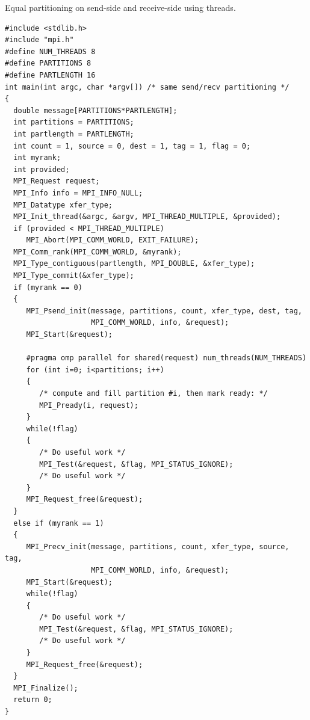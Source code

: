 \begin{example}
Equal partitioning on send-side and receive-side using threads.
\label{part-example2}%
%
%
\begin{lstlisting}[language={[MPI]C}]
#include <stdlib.h>
#include "mpi.h"
#define NUM_THREADS 8
#define PARTITIONS 8
#define PARTLENGTH 16
int main(int argc, char *argv[]) /* same send/recv partitioning */
{
  double message[PARTITIONS*PARTLENGTH];
  int partitions = PARTITIONS;
  int partlength = PARTLENGTH;
  int count = 1, source = 0, dest = 1, tag = 1, flag = 0;
  int myrank;
  int provided;
  MPI_Request request;
  MPI_Info info = MPI_INFO_NULL;
  MPI_Datatype xfer_type;
  MPI_Init_thread(&argc, &argv, MPI_THREAD_MULTIPLE, &provided);
  if (provided < MPI_THREAD_MULTIPLE)
     MPI_Abort(MPI_COMM_WORLD, EXIT_FAILURE);
  MPI_Comm_rank(MPI_COMM_WORLD, &myrank);
  MPI_Type_contiguous(partlength, MPI_DOUBLE, &xfer_type);
  MPI_Type_commit(&xfer_type);
  if (myrank == 0)
  {
     MPI_Psend_init(message, partitions, count, xfer_type, dest, tag,
                    MPI_COMM_WORLD, info, &request);
     MPI_Start(&request);

     #pragma omp parallel for shared(request) num_threads(NUM_THREADS)
     for (int i=0; i<partitions; i++)
     {
        /* compute and fill partition #i, then mark ready: */
        MPI_Pready(i, request);
     }
     while(!flag)
     {
        /* Do useful work */
        MPI_Test(&request, &flag, MPI_STATUS_IGNORE);
        /* Do useful work */
     }
     MPI_Request_free(&request);
  }
  else if (myrank == 1)
  {
     MPI_Precv_init(message, partitions, count, xfer_type, source, tag,
                    MPI_COMM_WORLD, info, &request);
     MPI_Start(&request);
     while(!flag)
     {
        /* Do useful work */
        MPI_Test(&request, &flag, MPI_STATUS_IGNORE);
        /* Do useful work */
     }
     MPI_Request_free(&request);
  }
  MPI_Finalize();
  return 0;
}
\end{lstlisting}
\end{example}

